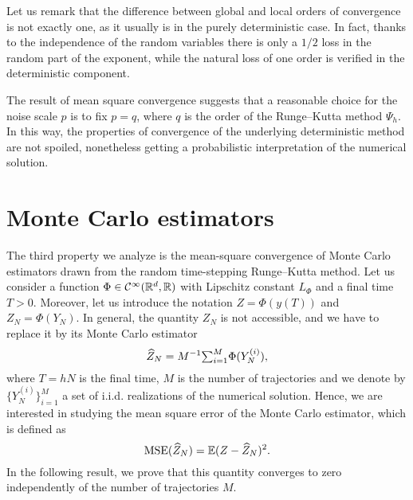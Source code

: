 \documentclass[10pt]{article}
\begin{document}
\begin{remark} Let us remark that the difference between global and local orders of convergence is not exactly one, as it usually is in the purely deterministic case. In fact, thanks to the independence of the random variables there is only a $1/2$ loss in the random part of the exponent, while the natural loss of one order is verified in the deterministic component.
\end{remark}
\begin{remark} The result of mean square convergence suggests that a reasonable choice for the noise scale $p$ is to fix $p=q$, where $q$ is the order of the Runge--Kutta method $\Psi_h$. In this way, the properties of convergence of the underlying deterministic method are not spoiled, nonetheless getting a probabilistic interpretation of the numerical solution.
\end{remark}

\section{Monte Carlo estimators}\label{sec:MonteCarlo}

The third property we analyze is the mean-square convergence of Monte Carlo estimators drawn from the random time-stepping Runge--Kutta method. Let us consider a function $\Phi\in\mathcal{C}^\infty(\mathbb{R}^d, \mathbb{R})$ with Lipschitz constant $L_\Phi$ and a final time $T > 0$. Moreover, let us introduce the notation $Z = \Phi(y(T))$ and $Z_N = \Phi(Y_N)$. In general, the quantity $Z_N$ is not accessible, and we have to replace it by its Monte Carlo estimator 
\begin{equation}\label{eq:MSE}
	\widehat Z_N = M^{-1} {\textstyle\sum}_{i = 1}^M \Phi(Y_N^{(i)}),
\end{equation}
where $T = hN$ is the final time, $M$ is the number of trajectories and we denote by $\{Y_N^{(i)}\}_{i=1}^M$ a set of i.i.d. realizations of the numerical solution. Hence, we are interested in studying the mean square error of the Monte Carlo estimator, which is defined as
\begin{equation}
	\operatorname{MSE}(\widehat Z_N) = \operatorname{\mathbb{E}}(Z - \widehat Z_N)^2.
\end{equation}
In the following result, we prove that this quantity converges to zero independently of the number of trajectories $M$.
\end{document}
